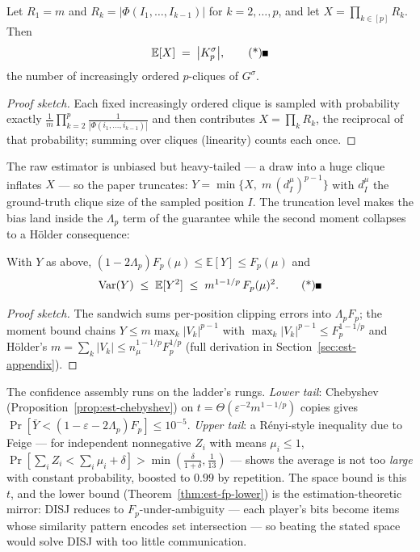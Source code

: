 \begin{lemma}
\label{lem:est-fp-unbiased}
Let $R_1 = m$ and $R_k = |\Phi(I_1,\dots,I_{k-1})|$ for $k = 2,\dots,p$, and let
$X = \prod_{k\in[p]} R_k$. Then
\[
\mathbb{E}[X] \;=\; \bigl|K_p^\sigma\bigr|, \eopm
\]
the number of increasingly ordered $p$-cliques of $G^\sigma$.
\end{lemma}

\begin{proof}[Proof sketch]
Each fixed increasingly ordered clique is sampled with probability exactly $\frac1m
\prod_{k=2}^p \frac{1}{|\Phi(i_1,\dots,i_{k-1})|}$ and then contributes $X = \prod_k R_k$,
the reciprocal of that probability; summing over cliques (linearity) counts each once.
\end{proof}

The raw estimator is unbiased but heavy-tailed --- a draw into a huge clique inflates $X$ ---
so the paper truncates: $Y = \min\{X,\; m\,(d_I^\mu)^{p-1}\}$ with $d_I^\mu$ the ground-truth
clique size of the sampled position $I$. The truncation level makes the bias land inside the
$\Lambda_p$ term of the guarantee while the second moment collapses to a H\"older consequence:

\begin{lemma}
\label{lem:est-fp-trunc}
With $Y$ as above, $(1-2\Lambda_p)F_p(\mu) \le \mathbb{E}[Y] \le F_p(\mu)$ and
\[
\operatorname{Var}(Y) \;\le\; \mathbb{E}[Y^2] \;\le\; m^{1-1/p}\, F_p(\mu)^2. \eopm
\]
\end{lemma}

\begin{proof}[Proof sketch]
The sandwich sums per-position clipping errors into $\Lambda_p F_p$; the moment bound chains
$Y \le m \max_k |V_k|^{p-1}$ with $\max_k |V_k|^{p-1} \le F_p^{1-1/p}$ and H\"older's $m =
\sum_k |V_k| \le n_\mu^{1-1/p} F_p^{1/p}$ (full derivation in
Section~\ref{sec:est-appendix}).
\end{proof}

The confidence assembly runs on the ladder's rungs. \emph{Lower tail}: Chebyshev
(Proposition~\ref{prop:est-chebyshev}) on $t = \Theta(\varepsilon^{-2}m^{1-1/p})$ copies gives
$\Pr[\bar Y < (1-\varepsilon-2\Lambda_p)F_p] \le 10^{-5}$. \emph{Upper tail}: a R\'enyi-style
inequality due to Feige --- for independent nonnegative $Z_i$ with means $\mu_i \le 1$,
$\Pr[\sum_i Z_i < \sum_i \mu_i + \delta] > \min(\frac{\delta}{1+\delta},\frac1{13})$ --- shows
the average is not too \emph{large} with constant probability, boosted to $0.99$ by
repetition. The space bound is this $t$, and the lower bound
(Theorem~\ref{thm:est-fp-lower}) is the estimation-theoretic mirror: DISJ reduces to
$F_p$-under-ambiguity --- each player's bits become items whose similarity pattern encodes
set intersection --- so beating the stated space would solve DISJ with too little
communication.

